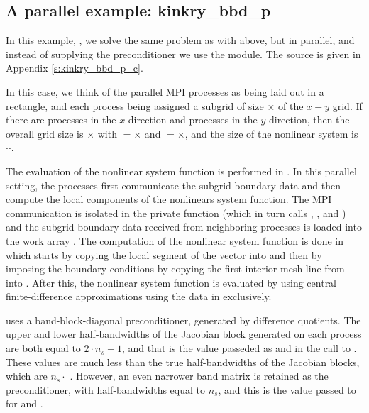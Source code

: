 
\subsection{A parallel example: kinkry\_bbd\_p}\label{ss:kinkry_bbd_p}

In this example, , we solve the same problem as with 
above, but in parallel, and instead of supplying the preconditioner we use the
{\kinbbdpre} module.  The source is given in Appendix \ref{s:kinkry_bbd_p_c}.

In this case, we think of the parallel MPI processes as
being laid out in a rectangle, and each process being assigned a
subgrid of size $\times$ of the $x-y$ grid. If
there are  processes in the $x$ direction and 
processes in the $y$ direction, then the overall grid size is
$\times$ with $=$$\times$ and
$=$$\times$, and the size of the nonlinear system is
$\cdot$$\cdot$.  

The evaluation of the nonlinear system function is performed in .
In this parallel setting, the processes first communicate the subgrid
boundary data and then compute the local components of the nonlinears system
function. The MPI communication is isolated in the private function 
(which in turn calls , , and ) and the 
subgrid boundary data received from neighboring processes is loaded into the
work array . The computation of the nonlinear system function is done
in  which starts by copying the local segment of the 
vector into  and then by imposing the boundary conditions by copying the
first interior mesh line from  into . After this, the nonlinear
system function is evaluated by using central finite-difference approximations
using the data in  exclusively.

{\kinbbdpre} uses a band-block-diagonal preconditioner, generated by difference
quotients.  The upper and lower half-bandwidths of the Jacobian block generated
on each process are both equal to $2 \cdot n_s - 1$, and that is the value
passeded as  and  in the call to .
These values are much less than the true half-bandwidths of the Jacobian blocks,
which are $n_s \cdot$ .  However, an even narrower band matrix
is retained as the preconditioner, with half-bandwidths equal to $n_s$, and this
is the value passed to  for  and .

